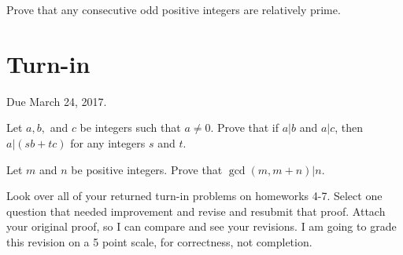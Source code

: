 \documentclass[12pt]{article}
\begin{document}
\begin{qu}
Prove that any consecutive odd positive integers are relatively prime.
\end{qu}

\newpage
\section{Turn-in} 

Due March 24, 2017.


\begin{qu}
Let $a, b,$ and $c$ be integers such that $a \ne 0$. Prove that if $a|b$ and $a|c$, then $a|(sb+tc)$ for any integers $s$ and $t$.
\end{qu}



\begin{qu}
Let $m$ and $n$ be positive integers. Prove that $\gcd(m, m+n) | n$.
\end{qu}

\begin{qu}
Look over all of your returned turn-in problems on homeworks 4-7. Select one question that needed improvement and revise and resubmit that proof. Attach your original proof, so I can compare and see your revisions. I am going to grade this revision on a 5 point scale, for correctness, not completion.
\end{qu}
\end{document}

